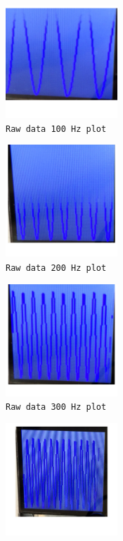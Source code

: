 \documentclass[12pt]{article}
\begin{document}
\begin{enumerate}
\begin{paracol}{2}
\begin{figure}[h!]
      \includegraphics[width=0.375\textwidth]{./img/raw_100Hz}
      \caption{\texttt{Raw data 100 Hz plot}}
      \label{fig:raw_100}
    \end{figure}
    \switchcolumn
    \begin{figure}[h!]
      \includegraphics[width=0.375\textwidth]{./img/raw_200Hz}
      \caption{\texttt{Raw data 200 Hz plot}}
      \label{fig:raw_200}
    \end{figure}
    \switchcolumn
    \begin{figure}[h!]
      \includegraphics[width=0.375\textwidth]{./img/raw_300Hz}
      \caption{\texttt{Raw data 300 Hz plot}}
      \label{fig:raw_300}
    \end{figure}
    \switchcolumn
    \begin{figure}[h!]
      \includegraphics[width=0.375\textwidth]{./img/raw_400Hz}

\end{figure}
\end{paracol}
\end{enumerate}
\end{document}
